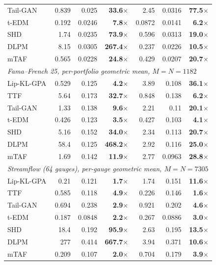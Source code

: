 \begin{table}[t]
\begin{tabular}{l rrr rrr}
Tail-GAN & 0.839 & 0.025 & \textbf{33.6}$\times$ & 2.45 & 0.0316 & \textbf{77.5}$\times$\\
t-EDM& 0.192 & 0.0246 & \textbf{7.8}$\times$ & 0.0872 & 0.0141 & \textbf{6.2}$\times$\\
SHD & 1.74 & 0.0235 & \textbf{73.9}$\times$ & 0.596 & 0.0313 & \textbf{19.0}$\times$\\
DLPM & 8.15 & 0.0305 & \textbf{267.4}$\times$ & 0.237 & 0.0226 & \textbf{10.5}$\times$\\
mTAF & 0.565 & 0.0228 & \textbf{24.8}$\times$ & 0.429 & 0.0207 & \textbf{20.7}$\times$\\
\midrule
\multicolumn{7}{l}{\textit{Fama--French 25, per-portfolio {geometric} mean, $M{=}N{=}1182$}}\\[1pt]
Lip-KL-GPA & {0.529} & {0.125} & \textbf{4.2}$\times$ & {3.89} & {0.108} & \textbf{{36.1}}$\times$\\
TTF & {5.64} & {0.173} & \textbf{{32.7}}$\times$ & {0.848} & {0.138} & \textbf{{6.2}}$\times$\\
Tail-GAN & {1.33} & {0.138} & \textbf{{9.6}}$\times$ & {2.21} & {0.11} & \textbf{{20.1}}$\times$\\
t-EDM & {0.426} & {0.123} & \textbf{3.5}$\times$ & {0.427} & {0.103} & \textbf{{4.1}}$\times$\\
SHD & {5.16} & {0.152} & \textbf{{34.0}}$\times$ & {2.34} & {0.113} & \textbf{{20.7}}$\times$\\
DLPM & {58.4} & {0.125} & \textbf{{468.2}}$\times$ & 2.92 & {0.116} & \textbf{{25.0}}$\times$\\
mTAF & {1.69} & {0.142} & \textbf{{11.9}}$\times$ & {2.77} & {0.0963} & \textbf{{28.8}}$\times$\\
\midrule
\multicolumn{7}{l}{\textit{Streamflow (64 gauges), per-gauge {geometric} mean, $M{=}N{=}7305$}}\\[1pt]
Lip-KL-GPA & {0.21} & {0.121} & \textbf{{1.7}}$\times$ & {1.74} & {0.151} & \textbf{{11.6}}$\times$\\
TTF & {0.585} & {0.118} & \textbf{{4.9}}$\times$ & {0.226} & {0.146} & \textbf{1.6}$\times$\\
Tail-GAN & {0.694} & {0.238} & \textbf{{2.9}}$\times$ & {0.921} & {0.202} & \textbf{{4.6}}$\times$\\
t-EDM & {0.187} & {0.0848} & \textbf{2.2}$\times$ & {0.267} & {0.0886} & \textbf{{3.0}}$\times$\\
SHD & {18.4} & {0.192} & \textbf{{95.9}}$\times$ & {2.63} & {0.195} & \textbf{{13.5}}$\times$\\
DLPM & {277} & {0.414} & \textbf{667.7}$\times$ & 3.94 & {0.371} & \textbf{{10.6}}$\times$\\
mTAF & {0.209} & {0.107} & \textbf{2.0}$\times$ & {0.704} & {0.179} & \textbf{{3.9}}$\times$\\
\bottomrule\end{tabular}
\end{table}
